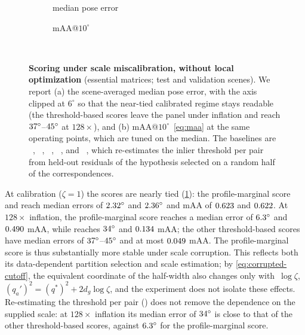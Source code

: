 \begin{figure}[ht]
	\centering
	\begin{subfigure}[t]{0.48\linewidth}
		\centering
		\caption{median pose error}
		
	\end{subfigure}\hfill
	\begin{subfigure}[t]{0.48\linewidth}
		\centering
		\caption{mAA@$10^\circ$}
		
	\end{subfigure}\\[3pt]
	\caption{\textbf{Scoring under scale miscalibration, without local
			optimization} (\phototourism essential matrices; \PTTestScenes{}
		test and \PTValScenes{} validation scenes). We report (a) the
		scene-averaged median pose error, with the axis clipped at $6^\circ$
		so that the near-tied calibrated regime stays readable (the
		threshold-based scores leave the panel under inflation and reach
		$37^\circ$--$45^\circ$ at
		$128\times$), and (b) mAA@$10^\circ$~\eqref{eq:maa} at the same %
		operating points, which are tuned on the median. The baselines are
		\ransac~\cite{Fischler1981}, \msac~\cite{Torr1998},
		\magsacpp~\cite{Barath2020}, \gau~\cite{Shekhovtsov2025}, and
		\simfitpp~\cite{Edstedt2025}, which re-estimates the inlier threshold
		per pair from held-out residuals of the hypothesis selected on a
		random half of the correspondences.}
	\label{fig:supp-sel-miscal}
\end{figure}

At calibration ($\zeta=1$) the scores are nearly tied
(\cref{fig:supp-sel-miscal}): the profile-marginal score and \simfitpp reach
median errors of $2.32^\circ$ and $2.36^\circ$ and mAA
of $0.623$ and $0.622$. At $128\times$ inflation, the %
profile-marginal score reaches a median error of $6.3^\circ$ and
$0.490$ mAA, while \simfitpp reaches $34^\circ$ and
$0.134$ mAA; the other threshold-based scores have median
errors of $37^\circ$--$45^\circ$ and at
most $0.049$ mAA. The profile-marginal score is thus
substantially more stable under scale corruption. This reflects both its
data-dependent partition selection and scale estimation; by
\eqref{eq:corrupted-cutoff}, the equivalent coordinate of the half-width also
changes only with~$\log\zeta$, $(q_a')^2 = (q^*)^2 + 2d_g\log\zeta$, and the
experiment does not isolate these effects. Re-estimating the threshold per pair (\simfitpp) does not
remove the dependence on the supplied scale: at $128\times$ inflation its %
median error of $34^\circ$ is close to that of the other
threshold-based scores, against $6.3^\circ$ for the
profile-marginal score.

